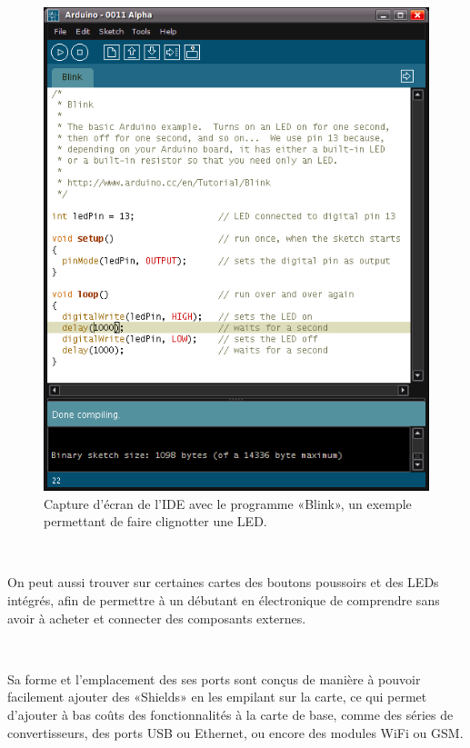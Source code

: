 \documentclass{article}
\begin{document}
\begin{figure}[h!]
    \centering\includegraphics[width=\linewidth/2]{img/arduino_ide.png}
    \caption{Capture d’écran de l’IDE avec le programme «Blink», un exemple permettant de faire clignotter une LED.}
\end{figure}

~

On peut aussi trouver sur certaines cartes des boutons poussoirs et des LEDs intégrés, afin de permettre à un débutant en électronique de comprendre sans avoir à acheter et connecter des composants externes.

~

Sa forme et l’emplacement des ses ports sont conçus de manière à pouvoir facilement ajouter des «Shields» en les empilant sur la carte, ce qui permet d’ajouter à bas coûts des fonctionnalités à la carte de base, comme des séries de convertisseurs, des ports USB ou Ethernet, ou encore des modules WiFi ou GSM.
\end{document}
